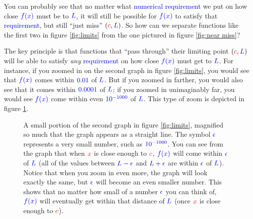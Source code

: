 \documentclass{myarticle}
\newcommand{\hor}[1]{\textcolor{red}{#1}}
\newcommand{\ver}[1]{\textcolor{blue}{#1}}
\theoremstyle{nospace}
\newtheorem{old series theorem}{Theorem}
\newenvironment{series theorem}
{\begin{mdframed}\begin{old series theorem}}
    {\end{old series theorem}\end{mdframed}}
\begin{document}
You can probably see that no matter what \ver{numerical requirement}
we put on how close $\ver{f(x)}$ must be to $\ver{L}$, it will still
be possible for $\ver{f(x)}$ to satisfy that \ver{requirement}, but
still ``just miss'' $(\hor{c}, \ver{L})$. So how can we separate
functions like the first two in figure \ref{fig:limits} from the one
pictured in figure \ref{fig:near miss}?

The key principle is that functions that ``pass through'' their
limiting point $(\hor{c}, \ver{L})$ will be able to satisfy \emph{any}
\ver{requirement} on how close $\ver{f(x)}$ must get to $\ver{L}$. For
instance, if you zoomed in on the second graph in figure
\ref{fig:limits}, you would see that $\ver{f(x)}$ comes within
$\ver{0.01}$ of $\ver{L}$. But if you zoomed in farther, you would
also see that it comes within $\ver{0.0001}$ of $\ver{L}$; if you
zoomed in unimaginably far, you would see $\ver{f(x)}$ come within
even $\ver{10^{-1000}}$ of $\ver{L}$. This type of zoom is depicted in
figure \ref{fig:zoom}.

\begin{figure}[htb!] \centering
  \caption{A small portion of the second graph in figure
    \ref{fig:limits}, magnified so much that the graph appears as a
    straight line. The symbol $\ver{\epsilon}$ represents a very small
    number, such as $\ver{10^{-1000}}$. You can see from the graph
    that when $\hor{x}$ is close enough to $\hor{c}$, $\ver{f(x)}$
    will come within $\ver{\epsilon}$ of $\ver{L}$ (all of the values
    between $\ver{L - \epsilon}$ and $\ver{L + \epsilon}$ are within
    $\ver{\epsilon}$ of $\ver{L}$). Notice that when you zoom in even
    more, the graph will look exactly the same, but $\ver{\epsilon}$
    will become an even smaller number. This shows that no matter how
    small of a number $\ver{\epsilon}$ you can think of, $\ver{f(x)}$
    will eventually get within that distance of $\ver{L}$ (once
    $\hor{x}$ is close enough to $\hor{c}$).}
  \label{fig:zoom}
\end{figure}
\end{document}
